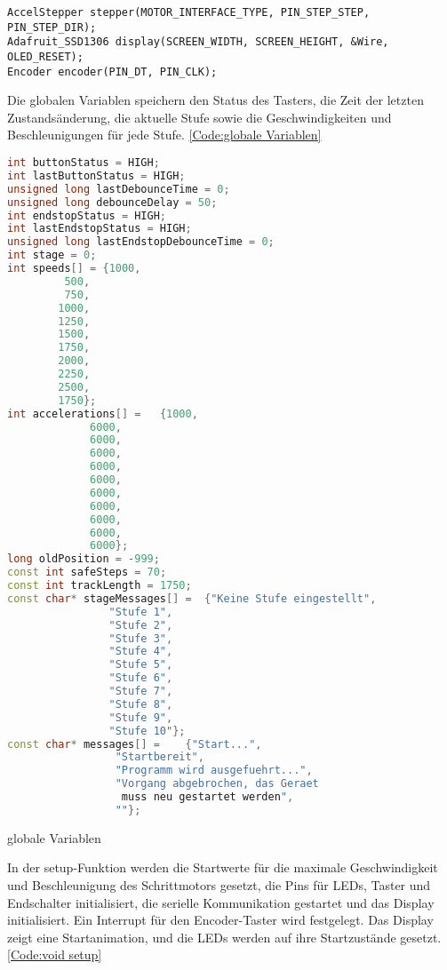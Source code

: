 \begin{lstlisting}
AccelStepper stepper(MOTOR_INTERFACE_TYPE, PIN_STEP_STEP, PIN_STEP_DIR);
Adafruit_SSD1306 display(SCREEN_WIDTH, SCREEN_HEIGHT, &Wire, OLED_RESET);
Encoder encoder(PIN_DT, PIN_CLK);
\end{lstlisting}

Die globalen Variablen speichern den Status des Tasters, die Zeit der letzten Zustandsänderung, die aktuelle Stufe sowie die Geschwindigkeiten und Beschleunigungen für jede Stufe. \ref{Code:globale Variablen}

\begin{code}
	\begin{lstlisting}[language=c++]
int buttonStatus = HIGH;
int lastButtonStatus = HIGH;
unsigned long lastDebounceTime = 0;
unsigned long debounceDelay = 50;
int endstopStatus = HIGH;
int lastEndstopStatus = HIGH;
unsigned long lastEndstopDebounceTime = 0;
int stage = 0;
int speeds[] = {1000, 
		 500,
		 750, 
		1000,
		1250, 
		1500, 
		1750, 
		2000, 
		2250, 
		2500, 
		1750};
int accelerations[] = 	{1000, 
			 6000, 
			 6000, 
			 6000, 
			 6000, 
			 6000, 
			 6000, 
			 6000, 
			 6000, 
			 6000, 
			 6000};
long oldPosition = -999;
const int safeSteps = 70;
const int trackLength = 1750;
const char* stageMessages[] =  {"Keine Stufe eingestellt", 
				"Stufe 1", 
				"Stufe 2", 
				"Stufe 3", 
				"Stufe 4", 
				"Stufe 5", 
				"Stufe 6", 
				"Stufe 7", 
				"Stufe 8", 
				"Stufe 9", 
				"Stufe 10"};
const char* messages[] = 	{"Start...", 
				 "Startbereit", 
				 "Programm wird ausgefuehrt...", 
				 "Vorgang abgebrochen, das Geraet
				  muss neu gestartet werden", 
				 ""};
\end{lstlisting}      

\caption[globale Variablen]{globale Variablen}\label{Code:globale Variablen}    
\end{code} 

In der setup-Funktion werden die Startwerte für die maximale Geschwindigkeit und Beschleunigung des Schrittmotors gesetzt, die Pins für LEDs, Taster und Endschalter initialisiert, die serielle Kommunikation gestartet und das Display initialisiert. Ein Interrupt für den Encoder-Taster wird festgelegt. Das Display zeigt eine Startanimation, und die LEDs werden auf ihre Startzustände gesetzt. \ref{Code:void setup}

